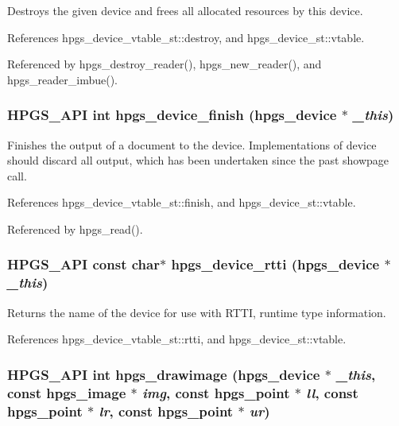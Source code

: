 Destroys the given device and frees all allocated resources by this device. 

References hpgs\_\-device\_\-vtable\_\-st::destroy, and hpgs\_\-device\_\-st::vtable.

Referenced by hpgs\_\-destroy\_\-reader(), hpgs\_\-new\_\-reader(), and hpgs\_\-reader\_\-imbue().
\subsubsection[hpgs\_\-device\_\-finish]{\setlength{\rightskip}{0pt plus 5cm}HPGS\_\-API int hpgs\_\-device\_\-finish ({\bf hpgs\_\-device} $\ast$ {\em \_\-this})}\label{group__device_g070f7e3d2c775d37785462eb0424bf89}


Finishes the output of a document to the device. Implementations of device should discard all output, which has been undertaken since the past showpage call. 

References hpgs\_\-device\_\-vtable\_\-st::finish, and hpgs\_\-device\_\-st::vtable.

Referenced by hpgs\_\-read().
\subsubsection[hpgs\_\-device\_\-rtti]{\setlength{\rightskip}{0pt plus 5cm}HPGS\_\-API const char$\ast$ hpgs\_\-device\_\-rtti ({\bf hpgs\_\-device} $\ast$ {\em \_\-this})}\label{group__device_g629c2e61e8761371bc343ce2118797ca}


Returns the name of the device for use with RTTI, runtime type information. 

References hpgs\_\-device\_\-vtable\_\-st::rtti, and hpgs\_\-device\_\-st::vtable.
\subsubsection[hpgs\_\-drawimage]{\setlength{\rightskip}{0pt plus 5cm}HPGS\_\-API int hpgs\_\-drawimage ({\bf hpgs\_\-device} $\ast$ {\em \_\-this}, \/  const {\bf hpgs\_\-image} $\ast$ {\em img}, \/  const {\bf hpgs\_\-point} $\ast$ {\em ll}, \/  const {\bf hpgs\_\-point} $\ast$ {\em lr}, \/  const {\bf hpgs\_\-point} $\ast$ {\em ur})}\label{group__device_g6c31703bf9edc382b8b89da02e8f0fed}



